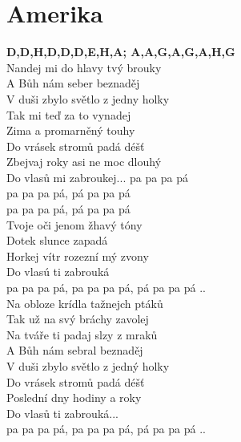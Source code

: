 \section{Amerika}
\onehalfspacing

\textbf{D,D,H,D,D,D,E,H,A; A,A,G,A,G,A,H,G }\\

Nandej mi do hlavy tvý brouky\\
A Bůh nám seber beznaděj\\
V duši zbylo světlo z jedny holky\\
Tak mi teď za to vynadej\\

Zima a promarněný touhy\\
Do vrásek stromů padá déšť\\
Zbejvaj roky asi ne moc dlouhý\\
Do vlasů mi zabroukej... pa pa pa pá\\

pa pa pa pá, pá pa pa pá\\
pa pa pa pá, pá pa pa pá\\

Tvoje oči jenom žhavý tóny\\
Dotek slunce zapadá\\
Horkej vítr rozezní mý zvony\\
Do vlasú ti zabrouká\\
pa pa pa pá, pa pa pa pá, pá pa pa pá ..\\

Na obloze krídla tažnejch ptáků\\
Tak už na svý bráchy zavolej\\
Na tváře ti padaj slzy z mraků\\
A Bůh nám sebral beznaděj\\

V duši zbylo světlo z jedný holky\\
Do vrásek stromů padá déšť\\
Poslední dny hodiny a roky\\
Do vlasů ti zabrouká...\\

pa pa pa pá, pa pa pa pá, pá pa pa pá ..\\